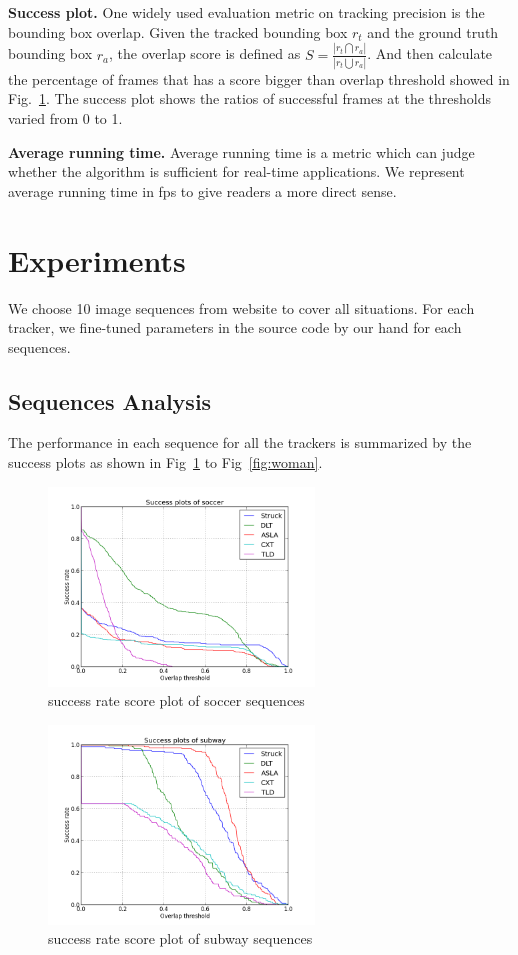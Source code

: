 \documentclass{acm_proc_article-sp}
\begin{document}
\textbf{Success plot.}
One widely used evaluation metric on tracking precision is the bounding box overlap. 
Given the tracked bounding box $r_t$ and the ground truth bounding box $r_a$, the overlap score is defined as $S = \frac{|r_t \bigcap r_a|}{|r_t \bigcup r_a|}$.
And then calculate the percentage of frames that has a score bigger than overlap threshold showed in Fig.~\ref{fig:soccer}.
The success plot shows the ratios of successful frames at the thresholds varied from 0 to 1. 

\textbf{Average running time.}
Average running time is a metric which can judge whether the algorithm is sufficient for real-time applications.
We represent average running time in fps to give readers a more direct sense.


\section{Experiments}

We choose 10 image sequences from website \cite{dataset} to cover all situations.
For each tracker, we fine-tuned parameters in the source code by our hand for each sequences.

\subsection{Sequences Analysis}

The performance in each sequence for all the trackers is summarized by the success plots as shown in Fig~\ref{fig:soccer} to Fig~\ref{fig:woman}.

\begin{figure}[hbt]
    \includegraphics[width=200pt]{soccer}
    \caption{success rate score plot of soccer sequences}
    \label{fig:soccer}
\end{figure}

\begin{figure}[hbt]
    \includegraphics[width=200pt]{subway}
    \caption{success rate score plot of subway sequences}
    \label{fig:subway}
\end{figure}
\end{document}
